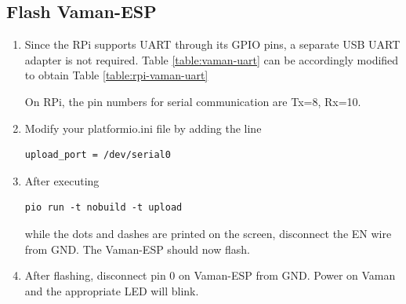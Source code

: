 \documentclass[journal,12pt,twocolumn]{IEEEtran}
\renewcommand\thesection{\arabic{section}}
\renewcommand\thesubsection{\thesection.\arabic{subsection}}
\begin{document}
\subsection{Flash Vaman-ESP}
\renewcommand{\theequation}{\theenumi}
\renewcommand{\thefigure}{\theenumi}
\begin{enumerate}[label=\thesubsection.\arabic*.,ref=\thesubsection.\theenumi]
\item Since the RPi supports UART through its GPIO pins, a separate USB UART adapter is not required.  Table 
		\ref{table:vaman-uart} can be accordingly modified to obtain Table 
		\ref{table:rpi-vaman-uart}
			\begin{table}[!h]
		
		\caption{}
		\label{table:rpi-vaman-uart}
	\end{table}
	On RPi, the pin numbers for serial communication are Tx=8, Rx=10.
\item Modify your platformio.ini file by adding the line 
\begin{lstlisting}
upload_port = /dev/serial0
\end{lstlisting}

\item After executing 
\begin{lstlisting}
pio run -t nobuild -t upload
\end{lstlisting}
while the dots and dashes are printed on the screen, disconnect the EN wire from GND.  The Vaman-ESP should now flash.
\item After flashing, disconnect pin 0 on Vaman-ESP from GND. Power on Vaman and the appropriate LED will blink.
\end{enumerate}
%
\end{document}
